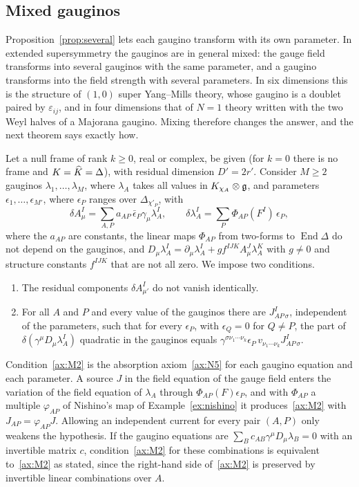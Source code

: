 \subsection{Mixed gauginos}
\label{ssec:mixed}

Proposition~\ref{prop:several} lets each gaugino transform with its own parameter. In extended supersymmetry the gauginos are in general mixed: the gauge field transforms into several gauginos with the same parameter, and a gaugino transforms into the field strength with several parameters. In six dimensions this is the structure of $(1,0)$ super Yang--Mills theory, whose gaugino is a doublet paired by $\varepsilon_{ij}$, and in four dimensions that of $N=1$ theory written with the two Weyl halves of a Majorana gaugino. Mixing therefore changes the answer, and the next theorem says exactly how.

Let a null frame of rank $k\ge0$, real or complex, be given (for $k=0$ there is no frame and $K=\widehat{K}=\Delta$), with residual dimension $D'=2r'$. Consider $M\ge2$ gauginos $\lambda_1,\dots,\lambda_M$, where $\lambda_A$ takes all values in $K_{\chi_A}\otimes\mathfrak{g}$, and parameters $\epsilon_1,\dots,\epsilon_{M'}$, where $\epsilon_P$ ranges over $\Delta_{\chi'_P}$, with
\begin{equation}
\label{eq:mixed}
\delta A^I_\mu=\sum_{A,P}a_{AP}\,\bar\epsilon_P\gamma_\mu\lambda^I_A,\qquad \delta\lambda^I_A=\sum_P\Phi_{AP}(F^I)\,\epsilon_P ,
\end{equation}
where the $a_{AP}$ are constants, the linear maps $\Phi_{AP}$ from two-forms to $\operatorname{End}\Delta$ do not depend on the gauginos, and $D_\mu\lambda^I_A=\partial_\mu\lambda^I_A+gf^{IJK}A^J_\mu\lambda^K_A$ with $g\ne0$ and structure constants $f^{IJK}$ that are not all zero. We impose two conditions.
\begin{enumerate}[label=(M\arabic*)]
\item\label{ax:M1} The residual components $\delta A^I_{\mu'}$ do not vanish identically.
\item\label{ax:M2} For all $A$ and $P$ and every value of the gauginos there are $J^I_{AP\,\sigma}$, independent of the parameters, such that for every $\epsilon_P$, with $\epsilon_Q=0$ for $Q\ne P$, the part of $\delta(\gamma^\mu D_\mu\lambda^I_A)$ quadratic in the gauginos equals $\gamma^{\sigma\nu_1\cdots\nu_k}\epsilon_P\,v_{\nu_1\cdots\nu_k}J^I_{AP\,\sigma}$.
\end{enumerate}
Condition~\ref{ax:M2} is the absorption axiom~\ref{ax:N5} for each gaugino equation and each parameter. A source $J$ in the field equation of the gauge field enters the variation of the field equation of $\lambda_A$ through $\Phi_{AP}(F)\epsilon_P$, and with $\Phi_{AP}$ a multiple $\varphi_{AP}$ of Nishino's map of Example~\ref{ex:nishino} it produces~\ref{ax:M2} with $J_{AP}=\varphi_{AP}J$. Allowing an independent current for every pair $(A,P)$ only weakens the hypothesis. If the gaugino equations are $\sum_Bc_{AB}\gamma^\mu D_\mu\lambda_B=0$ with an invertible matrix $c$, condition~\ref{ax:M2} for these combinations is equivalent to~\ref{ax:M2} as stated, since the right-hand side of~\ref{ax:M2} is preserved by invertible linear combinations over $A$.

